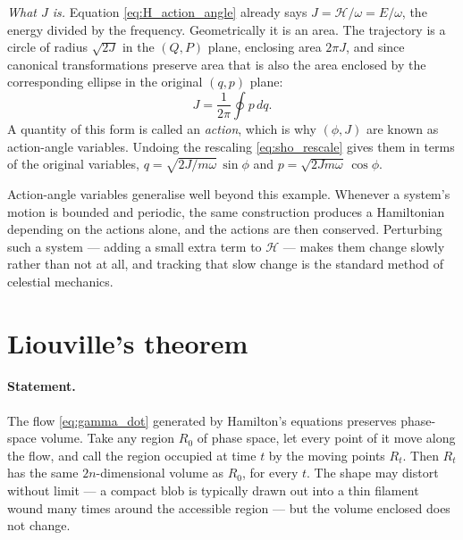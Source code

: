 \documentclass[12pt]{article}
\newcommand{\Ham}{\mathcal{H}}
\begin{document}
\emph{What $J$ is.}  Equation \eqref{eq:H_action_angle} already says
$J = \Ham/\omega = E/\omega$, the energy divided by the frequency.
Geometrically it is an area.  The trajectory is a circle of radius
$\sqrt{2J}$ in the $(Q,P)$ plane, enclosing area $2\pi J$, and since
canonical transformations preserve area that is also the area enclosed
by the corresponding ellipse in the original $(q,p)$ plane:
%
\begin{equation}
  J = \frac{1}{2\pi}\oint p\,dq .
\end{equation}
%
A quantity of this form is called an \emph{action}, which is why
$(\phi,J)$ are known as action-angle variables.  Undoing the rescaling
\eqref{eq:sho_rescale} gives them in terms of the original variables,
$q = \sqrt{2J/m\omega}\,\sin\phi$ and $p = \sqrt{2Jm\omega}\,\cos\phi$.

Action-angle variables generalise well beyond this example.  Whenever a
system's motion is bounded and periodic, the same construction produces
a Hamiltonian depending on the actions alone, and the actions are then
conserved.  Perturbing such a system --- adding a small extra term to
$\Ham$ --- makes them change slowly rather than not at all, and
tracking that slow change is the standard method of celestial
mechanics.

\section{Liouville's theorem}
\label{sec:liouville}

\paragraph{Statement.}  The flow \eqref{eq:gamma_dot} generated by
Hamilton's equations preserves phase-space volume.  Take any region
$R_0$ of phase space, let every point of it move along the flow, and
call the region occupied at time $t$ by the moving points $R_t$.  Then
$R_t$ has the same $2n$-dimensional volume as $R_0$, for every $t$.
The shape may distort without limit --- a compact blob is typically
drawn out into a thin filament wound many times around the accessible
region --- but the volume enclosed does not change.
\end{document}
